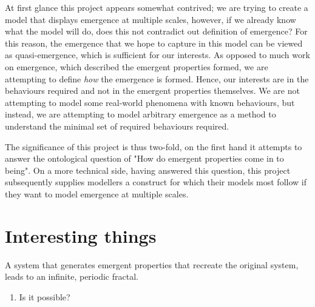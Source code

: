 \documentclass{article}
\begin{document}
  At first glance this project appears somewhat contrived; we are trying to create a model that displays emergence at multiple scales, however, if we already know what the model will do, does this not contradict out definition of emergence? For this reason, the emergence that we hope to capture in this model can be viewed as quasi-emergence, which is sufficient for our interests. As opposed to much work on emergence, which described the emergent properties formed, we are attempting to define \textit{how} the emergence is formed. Hence, our interests are in the behaviours required and not in the emergent properties themselves. We are not attempting to model some real-world phenomena with known behaviours, but instead, we are attempting to model arbitrary emergence as a method to understand the minimal set of required behaviours required.  

  The significance of this project is thus two-fold, on the first hand it attempts to answer the ontological question of "How do emergent properties come in to being". On a more technical side, having answered this question, this project subsequently supplies modellers a construct for which their models most follow if they want to model emergence at multiple scales.


\section{Interesting things}

  A system that generates emergent properties that recreate the original system, leads to an infinite, periodic fractal. 
  \begin{enumerate}[label=\textbf{\alph*)}]
    \item Is it possible?
  \end{enumerate}
\end{document}
